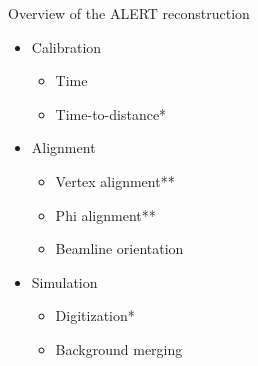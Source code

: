 \documentclass[10pt,aspectratio=43]{beamer}
\begin{document}
\begin{frame}{Overview of the ALERT reconstruction}
\begin{minipage}{0.45\linewidth}
    \end{minipage}
    \begin{minipage}{0.45\linewidth}
        \begin{itemize}
            \item Calibration
                \begin{itemize}
                    \item Time
                    \item Time-to-distance*
                \end{itemize}
            \item Alignment
                \begin{itemize}
                    \item Vertex alignment**
                    \item Phi alignment**
                    \item Beamline orientation
                \end{itemize}
            \item Simulation
                \begin{itemize}
                    \item Digitization*
                    \item Background merging
                \end{itemize}
        \end{itemize}
    \end{minipage}
    

\end{frame}
\end{document}
